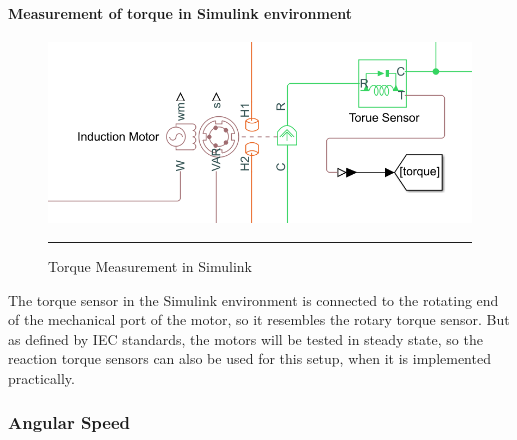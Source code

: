 \paragraph{Measurement of torque in Simulink environment}
\begin{figure}[htbp]
	\centering
		\includegraphics[width = 4.5in]{./Figures/MS/fig327.png}
		\rule{35em}{0.5pt}
	\caption{Torque Measurement in Simulink}
	\label{fig:Torque Measurement in Simulink} 
\end{figure}
The torque sensor in the Simulink environment is connected to the rotating end of the mechanical port of the motor, so it resembles the rotary torque sensor. But as defined by IEC standards, the motors will be tested in steady state, so the reaction torque sensors can also be used for this setup, when it is implemented practically.

\subsubsection{Angular Speed}
